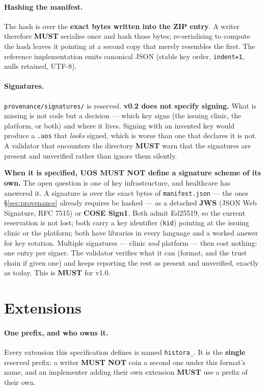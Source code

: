 \documentclass[11pt,a4paper]{article}
\newcommand{\MUST}{\textcolor{uosred}{\textbf{MUST}}}
\newcommand{\MUSTNOT}{\textcolor{uosred}{\textbf{MUST NOT}}}
\newcommand{\code}[1]{\texttt{\small #1}}
\begin{document}
\paragraph{Hashing the manifest.} The hash is over the \textbf{exact bytes written into the
ZIP entry}. A writer therefore \MUST{} serialise once and hash those bytes; re-serialising
to compute the hash leaves it pointing at a second copy that merely resembles the first.
The reference implementation emits canonical JSON (stable key order, \code{indent=1}, nulls
retained, UTF-8).

\paragraph{Signatures.} \code{provenance/signatures/} is reserved. \textbf{v0.2 does not
specify signing.} What is missing is not code but a decision --- which key signs (the
issuing clinic, the platform, or both) and where it lives. Signing with an invented key
would produce a \code{.uos} that \emph{looks} signed, which is worse than one that declares
it is not. A validator that encounters the directory \MUST{} warn that the signatures are
present and unverified rather than ignore them silently.

\textbf{When it is specified, UOS \MUSTNOT{} define a signature scheme of its own.} The
open question is one of key infrastructure, and healthcare has answered it. A signature is
over the exact bytes of \code{manifest.json} --- the ones \S\ref{sec:provenance} already
requires be hashed --- as a detached \textbf{JWS} (JSON Web Signature, RFC 7515) or
\textbf{COSE Sign1}. Both admit Ed25519, so the current reservation is not lost; both carry
a key identifier (\code{kid}) pointing at the issuing clinic or the platform; both have
libraries in every language and a worked answer for key rotation. Multiple signatures ---
clinic \emph{and} platform --- then cost nothing: one entry per signer. The validator
verifies what it can (format, and the trust chain if given one) and keeps reporting the
rest as present and unverified, exactly as today. This is \MUST{} for v1.0.

\section{Extensions}\label{sec:extensions}

\paragraph{One prefix, and who owns it.}
Every extension this specification defines is named \code{histora\_}. It is the
\textbf{single} reserved prefix: a writer \MUSTNOT{} coin a second one under this format's
name, and an implementer adding their own extension \MUST{} use a prefix of their own.
\end{document}
